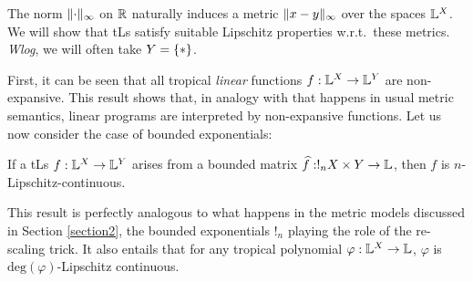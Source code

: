 \documentclass[submission,%
]{eptcs}
\begin{document}
The norm $\lVert\cdot\rVert_\infty$ on $\mathbb{R}$ naturally induces a metric $\lVert x-y\rVert_{\infty}$ over the spaces $\mathbb{L}^{X}$.
We will show that tLs satisfy suitable Lipschitz properties  w.r.t.~these metrics.
\emph{Wlog}, we will often take $Y=\{*\}$. 

First, it can be seen that all tropical \emph{linear} functions $f: \mathbb{L}^{X}\to \mathbb{L}^{Y}$ are non-expansive.  
This result shows that, in analogy with that happens in usual metric semantics, linear programs are interpreted by non-expansive functions. 
Let us now consider the case of bounded exponentials:
\begin{proposition}\label{prop:boundedlip}
If a tLs $f: \mathbb{L}^{X}\to \mathbb{L}^{Y}$ arises from a bounded matrix $\widehat{f}:!_{n}X\times Y\to \mathbb{L}$, then $f$ is $n$-Lipschitz-continuous.
\end{proposition}
This result is perfectly analogous to what happens in the metric models discussed in Section \ref{section2}, the bounded exponentials $!_{n}$ playing the role of the re-scaling trick.
It also entails that for any tropical polynomial $\varphi:\mathbb{L}^{X}\to\mathbb{L}$, $\varphi$ is $\mathrm{deg}(\varphi)$-Lipschitz continuous.
\end{document}
